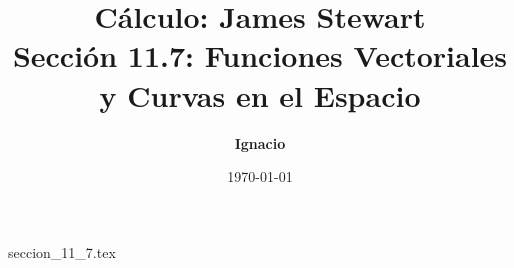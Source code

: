 \documentclass[11pt,spanish,oneside]{report}
\title{\textbf{Cálculo: James Stewart} \\ \Large Sección 11.7: Funciones Vectoriales y Curvas en el Espacio}
\author{\textbf{Ignacio}}
\date{\today}
\begin{document}
\maketitle

{seccion_11_7.tex}
\end{document}
